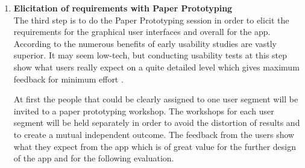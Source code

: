 \begin{enumerate}
	\item \textbf{Elicitation of requirements with Paper Prototyping} \\
	The third step is to do the Paper Prototyping session in order to elicit the requirements for the graphical user interfaces and overall for the app. According to \cite{lancaster2004paper} the numerous benefits of early usability studies are vastly superior. It may seem low-tech, but conducting usability tests at this step show what users really expect on a quite detailed level which gives maximum feedback for minimum effort \cite{weiss2003handheld}.
	
	At first the people that could be clearly assigned to one user segment will be invited to a paper prototyping workshop. The workshops for each user segment will be held separately in order to avoid the distortion of results and to create a mutual independent outcome. The feedback from the users show what they expect from the app which is of great value for the further design of the app \cite{snyder2003paper} and for the following evaluation.
	
%	
		
%	
	

\end{enumerate}
